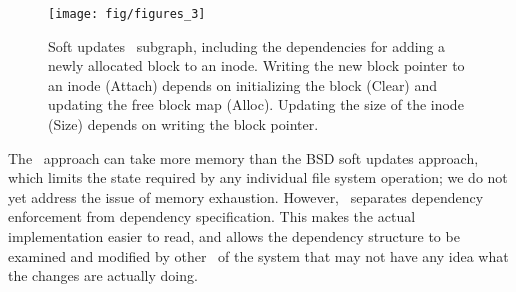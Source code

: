 \begin{figure}[htb]
  \centering
  \texttt{[image: fig/figures\_3]}
  \caption{\label{fig:softupdate} Soft updates \chdesc\ subgraph,
  including the dependencies for adding a newly allocated block to an
  inode. Writing the new block pointer to an inode (Attach) depends on
  initializing the block (Clear) and updating the free block map (Alloc).
  Updating the size of the inode (Size) depends on writing the block
  pointer.}
\end{figure}


The \Kudos\ approach can take more memory than the BSD soft updates approach,
which limits the state required by any individual file system operation; we do
not yet address the issue of memory exhaustion.
%
However, \Kudos\ separates dependency enforcement from dependency
specification. This makes the actual implementation easier to read, and allows
the dependency structure to be examined and modified by other \modules\ of the
system that may not have any idea what the changes are actually doing.
